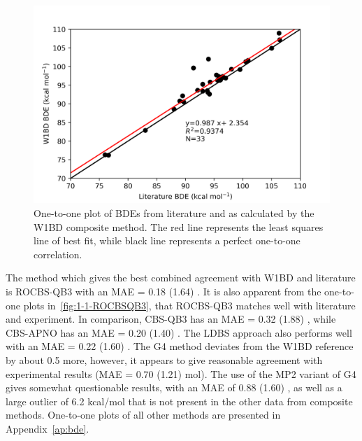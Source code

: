\begin{figure}[H]
  \centering
  \includegraphics[width=\textwidth]{figures/lit-w1bd}
  \caption[One-to-one plot of BDEs from literature and as calculated by the W1BD composite method.]{One-to-one plot of BDEs from literature\protect\cite{Luo2002} and as calculated by the W1BD composite method. The red line represents the least squares line of best fit, while black line represents a perfect one-to-one correlation.}
  \label{fig:1-1-W1BD}
\end{figure}

The method which gives the best combined agreement with W1BD and literature is ROCBS-QB3 with an MAE = 0.18 (1.64) \kcalmol. It is also apparent from the one-to-one plots in~\ref{fig:1-1-ROCBSQB3}, that ROCBS-QB3 matches well with literature and experiment. In comparison, CBS-QB3 has an MAE = 0.32 (1.88) \kcalmol, while CBS-APNO has an MAE = 0.20 (1.40) \kcalmol. The LDBS approach also performs well with an MAE = 0.22 (1.60) \kcalmol. The G4 method deviates from the W1BD reference by about 0.5 \kcalmol more, however, it appears to give reasonable agreement with experimental results (MAE = 0.70 (1.21) mol). The use of the MP2 variant of G4 gives somewhat questionable results, with an MAE of 0.88 (1.60) \kcalmol, as well as a large outlier of 6.2 kcal/mol that is not present in the other data from composite methods. One-to-one plots of all other methods are presented in Appendix~\ref{ap:bde}.

